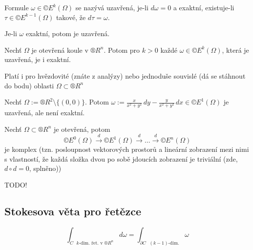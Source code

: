 \documentclass[12pt]{article}					%
\begin{document}
        \begin{definice}
            Formule $\omega \in ©E^k(\Omega)$ se nazývá uzavřená, je-li $d\omega = 0$ a exaktní, existuje-li $\tau \in ©E^{k-1}(\Omega)$ takové, že $d\tau = \omega$.
        \end{definice}

        \begin{poznamka}[Platí]
            Je-li $\omega$ exaktní, potom je uzavřená.
        \end{poznamka}

        \begin{lemma}
            Nechť $\Omega$ je otevřená koule v $®R^n$. Potom pro $k>0$ každé $\omega \in ©E^k(\Omega)$, která je uzavřená, je i exaktní.
            
            \begin{poznamkain}
                    Platí i pro hvězdovité (znáte z analýzy) nebo jednoduše souvislé (dá se stáhnout do bodu) oblasti $\Omega \subset ®R^n$
            \end{poznamkain}
        \end{lemma}

        \begin{poznamka}
            Nechť $\Omega := ®R^2 \setminus \{(0, 0)\}$. Potom $\omega := \frac{x}{x^2 + y^2}\,dy - \frac{y}{x^2 + y^2}\,dx \in ©E^1(\Omega)$ je uzavřená, ale není exaktní.
        \end{poznamka}

        \begin{definice}
            Nechť $\Omega \subset ®R^n$ je otevřená, potom
            $$ ©E^0(\Omega) \overset{d}{\rightarrow} ©E^1(\Omega) \overset{d}{\rightarrow} … \overset{d}{\rightarrow} ©E^n(\Omega) $$
            je komplex (tzn. posloupnost vektorových prostorů a lineární zobrazení mezi nimi s vlastností, že každá složka dvou po sobě jdoucích zobrazení je triviální (zde, $d\circ d = 0$, splněno))
        \end{definice}

        TODO!

    
    \subsection{Stokesova věta pro řetězce}
        \begin{poznamka}[Cíl]
                $$ \int_{C\text{ $k$-dim. řet. v $®R^n$}} d\omega = \int_{\partial C\text{ $(k-1)$-dim.}} \omega $$ 
        \end{poznamka}
\end{document}
